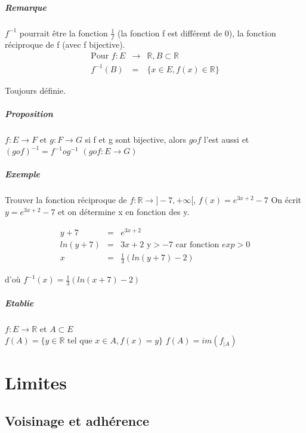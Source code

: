 \paragraph{Remarque} $f^{-1}$ pourrait être la fonction $\frac{1}{f}$ (la fonction f est différent de 0), la fonction réciproque de f (avec f bijective).
\[\begin{array}{rcl}
	\text{Pour } f : E & \rightarrow & \mathbb{R}, B \subset \mathbb{R} \\
	f^{-1}(B) & = & \{x \in E, f(x) \in \mathbb{R}\}
\end{array}\]

Toujours définie.

\paragraph{Proposition} $ f : E \rightarrow F$ et $g:F \rightarrow G$
si f et g sont bijective, alors $gof$ l'est aussi et $(gof)^{-1} = f^{-1}og^{-1}$ $(gof : E \rightarrow G)$

\paragraph{Exemple} Trouver la fonction réciproque de $f : \mathbb{R} \rightarrow ]-7, +\infty[ $, $f(x) = e^{3x+2} - 7$
On écrit $y = e^{3x+2}-7$ et on détermine x en fonction des y.

\[\begin{array}{rcl}
	y + 7 & = & e^{3x+2} \\
	ln(y+7) & = & 3x + 2  \text{ y} > -7 \text{ car fonction } exp > 0\\
	x &=& \frac{1}{3}(ln(y+7)-2)
\end{array}\]

d'où $f^{-1}(x) = \frac{1}{3}(ln(x+7)-2)$

\paragraph{Etablie} $f : E \rightarrow \mathbb{R}$ et $A \subset E$ ~\\
$f(A) = \{y \in \mathbb{R} \text{ tel que } x \in A, f(x) = y\}$
$f(A) = im(f_{|A})$

\chapter{Limites}

\section{Voisinage et adhérence}
